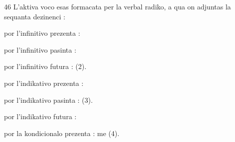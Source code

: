 \begin{VUpage}[50]{46}
L'aktiva voco esas formacata per la verbal radiko, a qua\nl
on adjuntas la sequanta dezinenci :

\VUblanc{2.85pt}%
 por l'infinitivo prezenta : 

 por l'infinitivo pasinta : 

 por l'infinitivo futura :  (2).

 por l'indikativo prezenta : 

 por l'indikativo pasinta :  (3).

 por l'indikativo futura : 

 por la kondicionalo prezenta : me  (4).
\end{VUpage}

